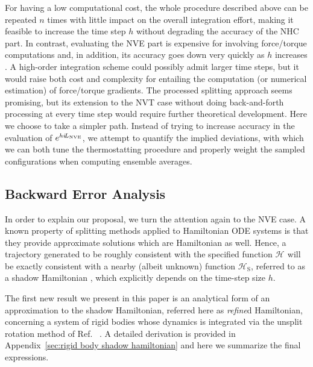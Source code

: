 \documentclass[
journal=jctcce,
layout=twocolumn
]{achemso}
\newcommand{\Ham}[1]{{\mathcal H}_\text{#1}}    %
\newcommand{\Liu}[1]{i\!L_\text{#1}}            %
\newcommand{\timestep}{h}
\begin{document}
For having a low computational cost, the whole procedure described above can be repeated $n$ times with little impact on the overall integration effort, making it feasible to increase the time step $\timestep$ without degrading the accuracy of the NHC part.
In contrast, evaluating the NVE part is expensive for involving force/torque computations and, in addition, its accuracy goes down very quickly as $\timestep$ increases \cite{Davidchack_2010, Silveira_2017}.
A high-order integration scheme\cite{Omelyan_2007, Van_zon_2008} could possibly admit larger time steps, but it would raise both cost and complexity for entailing the computation (or numerical estimation) of force/torque gradients.
The processed splitting approach \cite{Omelyan_2008} seems promising, but its extension to the NVT case without doing back-and-forth processing at every time step would require further theoretical development.
Here we choose to take a simpler path.
Instead of trying to increase accuracy in the evaluation of $e^{\timestep \Liu{\tiny NVE}}$, we attempt to quantify the implied deviations, with which we can both tune the thermostatting procedure and properly weight the sampled configurations when computing ensemble averages.

\subsection{Backward Error Analysis}
\label{sec:modified_h}

In order to explain our proposal, we turn the attention again to the NVE case.
A known property of splitting methods applied to Hamiltonian ODE systems is that they provide approximate solutions which are Hamiltonian as well.
Hence, a trajectory generated to be roughly consistent with the specified function $\Ham{}$ will be exactly consistent with a nearby (albeit unknown) function $\Ham{S}$, referred to as a shadow Hamiltonian \cite{Hairer_2006}, which explicitly depends on the time-step size $\timestep$.

The first new result we present in this paper is an analytical form of an approximation to the shadow Hamiltonian, referred here as \textit{refine}d Hamiltonian, concerning a system of rigid bodies whose dynamics is integrated via the unsplit rotation method of Ref.~ .
A detailed derivation is provided in Appendix~\ref{sec:rigid body shadow hamiltonian} and here we summarize the final expressions.
\end{document}
